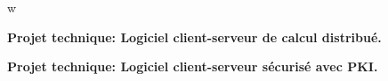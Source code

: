 w\documentclass[10pt,a4paper]{.altacv}
\begin{document}

\textbf{\large Projet technique: Logiciel client-serveur de calcul distribué.}

\divider

\textbf{\large Projet technique: Logiciel client-serveur sécurisé avec PKI.}








\end{document}

